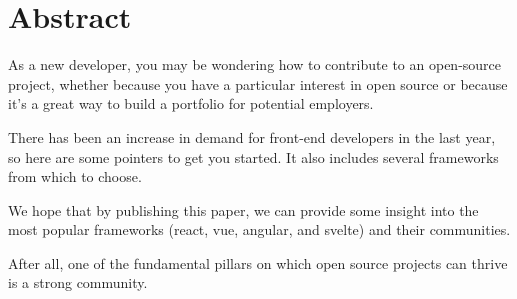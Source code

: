 \section{Abstract}
As a new developer, you may be wondering how to contribute to an open-source project, whether because you have a particular interest in open source or because it's a great way to build a portfolio for potential employers.

There has been an increase in demand for front-end developers in the last year, so here are some pointers to get you started. It also includes several frameworks from which to choose.

We hope that by publishing this paper, we can provide some insight into the most popular frameworks (react, vue, angular, and svelte) and their communities. 

After all, one of the fundamental pillars on which open source projects can thrive is a strong community.